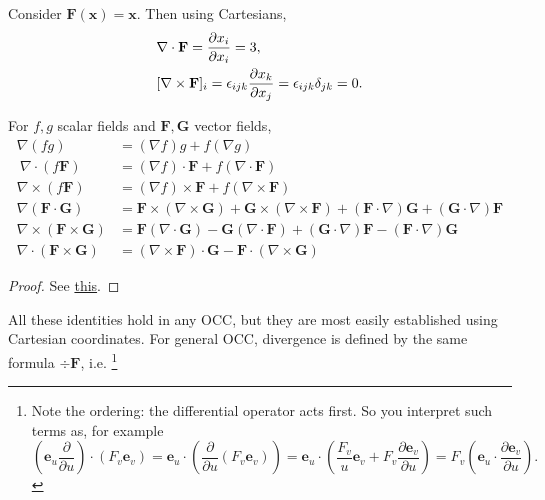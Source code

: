 \begin{example}
    Consider $ \mathbf{F}(\mathbf{x}) = \mathbf{x} $. Then using Cartesians, 
    \begin{align*}
        &\nabla\cdot \mathbf{F}= \frac{\partial x_i}{\partial x_i} = 3,\\ 
        &[\nabla\times \mathbf{F}]_{i} = \epsilon_{ijk}\frac{\partial x_k}{\partial x_j}=\epsilon_{ijk}\delta_{jk} = 0. \\  
    \end{align*}
\end{example}
\begin{proposition}
    For $f,g$ scalar fields and $ \mathbf{F},\mathbf{G} $ vector fields,
    \begin{align*}
      \nabla(fg) &= (\nabla f)g + f(\nabla g)\\\
      \nabla\cdot (f\mathbf{F}) &= (\nabla f)\cdot \mathbf{F} + f(\nabla\cdot \mathbf{F})\\
      \nabla\times (f\mathbf{F}) &= (\nabla f)\times \mathbf{F} + f(\nabla\times \mathbf{F})\\
      \nabla(\mathbf{F}\cdot \mathbf{G}) &= \mathbf{F}\times (\nabla \times \mathbf{G}) + \mathbf{G}\times (\nabla \times \mathbf{F}) + (\mathbf{F}\cdot \nabla)\mathbf{G} + (\mathbf{G}\cdot \nabla) \mathbf{F}\\
      \nabla \times (\mathbf{F}\times \mathbf{G}) &= \mathbf{F}(\nabla\cdot \mathbf{G}) - \mathbf{G}(\nabla\cdot \mathbf{F}) + (\mathbf{G}\cdot \nabla)\mathbf{F} - (\mathbf{F}\cdot \nabla)\mathbf{G}\\
      \nabla\cdot (\mathbf{F}\times \mathbf{G}) &= (\nabla\times \mathbf{F})\cdot \mathbf{G} - \mathbf{F}\cdot (\nabla\times \mathbf{G})
    \end{align*}
\end{proposition}
\begin{proof}
    See \href{https://www.vle.cam.ac.uk/pluginfile.php/19798882/mod_resource/content/9/vc_notes1.pdf#page=32}{this}.
\end{proof}
All these identities hold in any OCC, but they are most easily established using Cartesian coordinates. For general OCC, divergence is defined by the same formula $ \div \mathbf{F} $, i.e. \footnote{Note the ordering: the differential operator acts first. So you interpret such terms as, for example
\[
    \left( \mathbf{e}_u \frac{\partial }{\partial u}  \right) \cdot (F_v\mathbf{e}_v)= \mathbf{e}_u \cdot \left( \frac{\partial }{\partial u}(F_v\mathbf{e}_v)  \right) = \mathbf{e}_u \cdot \left( \frac{F_v}{u}\mathbf{e}_v+F_v \frac{\partial \mathbf{e}_v}{\partial u}  \right)=F_v\left( \mathbf{e}_u \cdot \frac{\partial \mathbf{e}_v}{\partial u}  \right).
\]}
